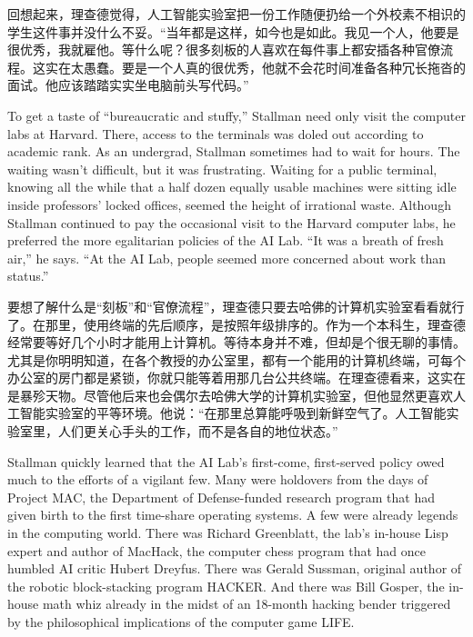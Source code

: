 \ifdefined\chs
回想起来，理查德觉得，人工智能实验室把一份工作随便扔给一个外校素不相识的学生这件事并没什么不妥。“当年都是这样，如今也是如此。我见一个人，他要是很优秀，我就雇他。等什么呢？很多刻板的人喜欢在每件事上都安插各种官僚流程。这实在太愚蠢。要是一个人真的很优秀，他就不会花时间准备各种冗长拖沓的面试。他应该踏踏实实坐电脑前头写代码。”
\fi

\ifdefined\eng
To get a taste of ``bureaucratic and stuffy,'' Stallman need only visit the computer labs at Harvard. There, access to the terminals was doled out according to academic rank. As an undergrad, Stallman sometimes had to wait for hours. The waiting wasn't difficult, but it was frustrating. Waiting for a public terminal, knowing all the while that a half dozen equally usable machines were sitting idle inside professors' locked offices, seemed the height of irrational waste. Although Stallman continued to pay the occasional visit to the Harvard computer labs, he preferred the more egalitarian policies of the AI Lab. ``It was a breath of fresh air,'' he says. ``At the AI Lab, people seemed more concerned about work than status.''
\fi

\ifdefined\chs
要想了解什么是“刻板”和“官僚流程”，理查德只要去哈佛的计算机实验室看看就行了。在那里，使用终端的先后顺序，是按照年级排序的。作为一个本科生，理查德经常要等好几个小时才能用上计算机。等待本身并不难，但却是个很无聊的事情。尤其是你明明知道，在各个教授的办公室里，都有一个能用的计算机终端，可每个办公室的房门都是紧锁，你就只能等着用那几台公共终端。在理查德看来，这实在是暴殄天物。尽管他后来也会偶尔去哈佛大学的计算机实验室，但他显然更喜欢人工智能实验室的平等环境。他说：“在那里总算能呼吸到新鲜空气了。人工智能实验室里，人们更关心手头的工作，而不是各自的地位状态。”
\fi

\ifdefined\eng
Stallman quickly learned that the AI Lab's first-come, first-served policy owed much to the efforts of a vigilant few. Many were holdovers from the days of Project MAC, the Department of Defense-funded research program that had given birth to the first time-share operating systems. A few were already legends in the computing world. There was Richard Greenblatt, the lab's in-house Lisp expert and author of MacHack, the computer chess program that had once humbled AI critic Hubert Dreyfus. There was Gerald Sussman, original author of the robotic block-stacking program HACKER. And there was Bill Gosper, the in-house math whiz already in the midst of an 18-month hacking bender triggered by the philosophical implications of the computer game LIFE.
\fi


